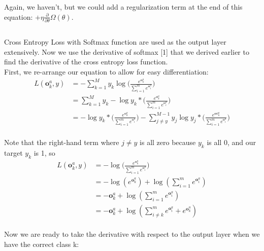 \documentclass[reqno]{amsart}
\theoremstyle{definition}
\theoremstyle{remark}
\numberwithin{equation}{section}
\begin{document}
Again, we haven't, but we could add a regularization term at the end of this equation: $+ \eta \frac{\partial}{\partial\theta}\Omega(\theta)$.

\subsection{}

Cross Entropy Loss with Softmax function are used as the output layer extensively. Now we use the derivative of softmax [1] that we derived earlier to find the derivative of the cross entropy loss function. \\

First, we re-arrange our equation to allow for easy differentiation: \\

\begin{align} 
    L(\mathbf{o}_k^a, y) &= -\sum_{k=1}^M y_{k}\log \Bigg(     
        \frac{e^{\mathbf{o}_k^a}}{\sum_{i=1}^m e^{\mathbf{o}_i^a}}
    \Bigg) \\
    &= \sum_{k=1}^M y_{k} - \log y_k * \Bigg(     
        \frac{e^{\mathbf{o}_k^a}}{\sum_{i=1}^m e^{\mathbf{o}_i^a}}
    \Bigg) \\
    &= - \log y_k * \Bigg(     
        \frac{e^{\mathbf{o}_k^a}}{\sum_{i=1}^m e^{\mathbf{o}_i^a}}
    \Bigg)
     - \sum_{j \neq y}^{M-1} y_{j} \log y_j * \Bigg(     
        \frac{e^{\mathbf{o}o_k^a}}{\sum_{i=1}^m e^{\mathbf{o}_i^a}}
    \Bigg) \\
\end{align}

Note that the right-hand term where $ j \neq y $ is all zero because $ y_k $ is all 0, and our target $y_k$ is 1, so \\

\begin{align}
    L(\mathbf{o}_k^a, y) &= - \log \Bigg(     
        \frac{e^{\mathbf{o}_k^a}}{\sum_{i=1}^m e^{\mathbf{o}_i^a}}
    \Bigg) \\
    &= - \log (e^{\mathbf{o}_k^a}) + \log (\sum_{i=1}^m e^{\mathbf{o}_i^a}) \\
    &= -\mathbf{o}_k^a + \log (\sum_{i=1}^m e^{\mathbf{o}_i^a}) \\
    &= -\mathbf{o}_k^a + \log (\sum_{i \neq k}^m e^{\mathbf{o}_i^a} + e^{\mathbf{o}_k^a})
\end{align} \\

Now we are ready to take the derivative with respect to the output layer when we have the correct class k: \\
\end{document}
